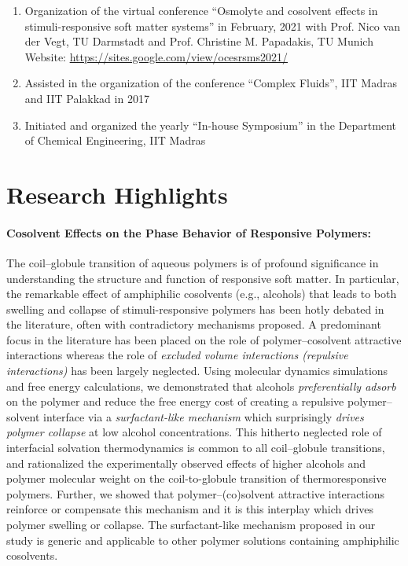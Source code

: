 \documentclass[a4paper,14pt]{article}
\begin{document}
\begin{enumerate}
\item
Organization of the virtual conference \enquote{Osmolyte and cosolvent effects
in stimuli-responsive soft matter systems} in February, 2021 with Prof. Nico
van der Vegt, TU Darmstadt and Prof. Christine M. Papadakis, TU Munich\\
Website:
\href{https://sites.google.com/view/ocesrsms2021/}{https://sites.google.com/view/ocesrsms2021/}
\item
Assisted in the organization of the conference \enquote{Complex Fluids}, IIT
Madras and IIT Palakkad in 2017 
\item
Initiated and organized the yearly \enquote{In-house Symposium} in the
Department of Chemical Engineering, IIT Madras 
\end{enumerate}
\section*{Research Highlights}

\paragraph{\textbf{Cosolvent Effects on the Phase Behavior of Responsive Polymers:}}
The coil–globule transition of aqueous polymers is of profound significance in
understanding the structure and function of responsive soft matter. In
particular, the remarkable effect of amphiphilic cosolvents (e.g., alcohols)
that leads to both swelling and collapse of stimuli-responsive polymers has
been hotly debated in the literature, often with contradictory mechanisms
proposed. A predominant focus in the literature has been placed on the role of
polymer–cosolvent attractive interactions whereas the role of \textit{excluded
volume interactions (repulsive interactions)} has been largely neglected.
Using molecular dynamics simulations and free energy calculations, we
demonstrated that alcohols \textit{preferentially adsorb} on the polymer and
reduce the free energy cost of creating a repulsive polymer–solvent interface
via a \textit{surfactant-like mechanism} which surprisingly \textit{drives
polymer collapse} at low alcohol concentrations. This hitherto neglected role
of interfacial solvation thermodynamics is common to all coil–globule
transitions, and rationalized the experimentally observed effects of higher
alcohols and polymer molecular weight on the coil-to-globule transition of
thermoresponsive polymers. Further, we showed that polymer–(co)solvent
attractive interactions reinforce or compensate this mechanism and it is this
interplay which drives polymer swelling or collapse. The surfactant-like
mechanism proposed in our study is generic and applicable to other polymer
solutions containing amphiphilic cosolvents.
\end{document}
